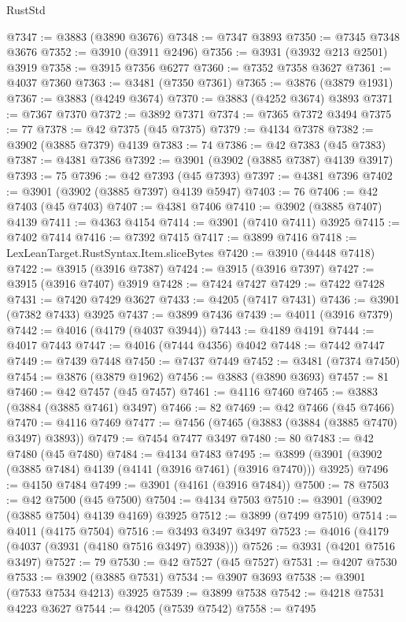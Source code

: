 \begin{lexlean}{RustStd}
\begin{coremodule}
@7347 := @3883 (@3890 @3676)
@7348 := @7347 @3893
@7350 := @7345 @7348 @3676
@7352 := @3910 (@3911 @2496)
@7356 := @3931 (@3932 @213 @2501) @3919
@7358 := @3915 @7356 @6277
@7360 := @7352 @7358 @3627
@7361 := @4037 @7360
@7363 := @3481 (@7350 @7361)
@7365 := @3876 (@3879 @1931)
@7367 := @3883 (@4249 @3674)
@7370 := @3883 (@4252 @3674) @3893
@7371 := @7367 @7370
@7372 := @3892 @7371
@7374 := @7365 @7372 @3494
@7375 := 77
@7378 := @42 @7375 (@45 @7375)
@7379 := @4134 @7378
@7382 := @3902 (@3885 @7379) @4139
@7383 := 74
@7386 := @42 @7383 (@45 @7383)
@7387 := @4381 @7386
@7392 := @3901 (@3902 (@3885 @7387) @4139 @3917)
@7393 := 75
@7396 := @42 @7393 (@45 @7393)
@7397 := @4381 @7396
@7402 := @3901 (@3902 (@3885 @7397) @4139 @5947)
@7403 := 76
@7406 := @42 @7403 (@45 @7403)
@7407 := @4381 @7406
@7410 := @3902 (@3885 @7407) @4139
@7411 := @4363 @4154
@7414 := @3901 (@7410 @7411) @3925
@7415 := @7402 @7414
@7416 := @7392 @7415
@7417 := @3899 @7416
@7418 := LexLeanTarget.RustSyntax.Item.sliceBytes
@7420 := @3910 (@4448 @7418)
@7422 := @3915 (@3916 @7387)
@7424 := @3915 (@3916 @7397)
@7427 := @3915 (@3916 @7407) @3919
@7428 := @7424 @7427
@7429 := @7422 @7428
@7431 := @7420 @7429 @3627
@7433 := @4205 (@7417 @7431)
@7436 := @3901 (@7382 @7433) @3925
@7437 := @3899 @7436
@7439 := @4011 (@3916 @7379)
@7442 := @4016 (@4179 (@4037 @3944))
@7443 := @4189 @4191
@7444 := @4017 @7443
@7447 := @4016 (@7444 @4356) @4042
@7448 := @7442 @7447
@7449 := @7439 @7448
@7450 := @7437 @7449
@7452 := @3481 (@7374 @7450)
@7454 := @3876 (@3879 @1962)
@7456 := @3883 (@3890 @3693)
@7457 := 81
@7460 := @42 @7457 (@45 @7457)
@7461 := @4116 @7460
@7465 := @3883 (@3884 (@3885 @7461) @3497)
@7466 := 82
@7469 := @42 @7466 (@45 @7466)
@7470 := @4116 @7469
@7477 := @7456 (@7465 (@3883 (@3884 (@3885 @7470) @3497) @3893))
@7479 := @7454 @7477 @3497
@7480 := 80
@7483 := @42 @7480 (@45 @7480)
@7484 := @4134 @7483
@7495 := @3899 (@3901 (@3902 (@3885 @7484) @4139 (@4141 (@3916 @7461) (@3916 @7470))) @3925)
@7496 := @4150 @7484
@7499 := @3901 (@4161 (@3916 @7484))
@7500 := 78
@7503 := @42 @7500 (@45 @7500)
@7504 := @4134 @7503
@7510 := @3901 (@3902 (@3885 @7504) @4139 @4169) @3925
@7512 := @3899 (@7499 @7510)
@7514 := @4011 (@4175 @7504)
@7516 := @3493 @3497 @3497
@7523 := @4016 (@4179 (@4037 (@3931 (@4180 @7516 @3497) @3938)))
@7526 := @3931 (@4201 @7516 @3497)
@7527 := 79
@7530 := @42 @7527 (@45 @7527)
@7531 := @4207 @7530
@7533 := @3902 (@3885 @7531)
@7534 := @3907 @3693
@7538 := @3901 (@7533 @7534 @4213) @3925
@7539 := @3899 @7538
@7542 := @4218 @7531 @4223 @3627
@7544 := @4205 (@7539 @7542)
@7558 := @7495

\end{coremodule}
\end{lexlean}
